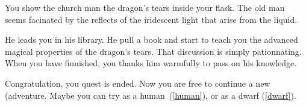 You show the church man the dragon's tears inside your flask. The old man seems
facinated by the reflects of the iridescent light that arise from the liquid.

He leads you in his library. He pull a book and start to teach you the advanced
magical properties of the dragon's tears. That discussion is simply
pationnating. When you have finnished, you thanks him warmfully to pass on his
knowledge.

Congratulation, you quest is ended. Now you are free to continue a new
(adventure. Maybe you can try as a human~(\ref{human}), or as a dwarf
(\ref{dwarf}).
